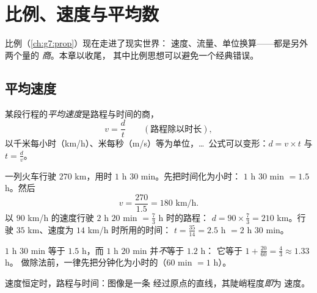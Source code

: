 \chapter{比例、速度与平均数}\label{ch:g8:speed}

比例（\cref{ch:g7:prop}）现在走进了现实世界：
速度、流量、单位换算——都是另外两个量的
\emph{商}。本章以收尾，
其中比例思想可以避免一个经典错误。

\section{平均速度}

\begin{definition}[平均速度]\label{def:g8:speed:def}
某段行程的\emph{平均速度}是路程与时间的商，
\[
v = \frac{d}{t}
\qquad
\left(\text{路程除以时长}\right),
\]
以千米每小时（km/h）、米每秒（m/s）等为单位，\dots\ 
公式可以变形：$d = v \times t$ 与 $t = \frac{d}{v}$。
\end{definition}

\begin{example}\label{ex:g8:speed:basic}
一列火车行驶 $270$ km，用时 $1$ h $30$ min。先把时间化为小时：
$1$ h $30$ min $= 1.5$ h。然后
\[
v = \frac{270}{1.5} = 180 \text{ km/h}.
\]
以 $90$ km/h 的速度行驶 $2$ h $20$ min $= \frac73$ h 时的路程：
$d = 90 \times \frac73 = 210$ km。行驶 $35$ km、速度为 $14$ km/h 时所用的时间：
$t = \frac{35}{14} = 2.5$ h $= 2$ h $30$ min。
\end{example}

\begin{remark}[分钟不是小数]
$1$ h $30$ min 等于 $1.5$ h，而 $1$ h $20$ min 并\emph{不}等于 $1.2$ h：
它等于 $1 + \frac{20}{60} = \frac43 \approx 1.33$ h。
做除法前，一律先把分钟化为小时的（$60$ min $= 1$ h）。
\end{remark}

\begin{omfigure}

{\small 速度恒定时，路程与时间：图像是一条
经过原点的直线，其陡峭程度\emph{即}为
速度。}
\end{omfigure}

